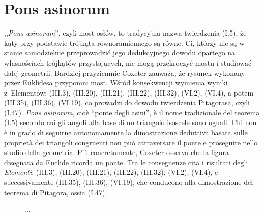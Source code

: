 
%



\section{Pons asinorum}

,,\emph{Pons asinorum}'', czyli most osłów, to tradycyjna nazwa twierdzenia (I.5), że kąty przy podstawie trójkąta równoramiennego są równe. %
Ci, którzy nie są w stanie samodzielnie przeprowadzić jego dedukcyjnego dowodu opartego na własnościach trójkątów przystających, nie mogą przekroczyć mostu i studiować dalej geometrii. %
Bardziej przyziemnie Coxeter \cite[s. 22-24]{coxeter_1967} zauważa, że rysunek wykonany przez Euklidesa przypomni most. %
Wśród konsekwencji wymienia wyniki z~Elementów: (III.3), (III.20), (III.21), (III.22), (III.32), (VI.2), (VI.4), a potem (III.35), (III.36), (VI.19), co prowadzi do dowodu twierdzenia Pitagorasa, czyli (I.47). %
\emph{Pons asinorum}, cioè ``ponte degli asini'', è il nome tradizionale del teorema (I.5) secondo cui gli angoli alla base di un triangolo isoscele sono uguali. %
Chi non è in grado di seguirne autonomamente la dimostrazione deduttiva basata sulle proprietà dei triangoli congruenti non può attraversare il ponte e proseguire nello studio della geometria. %
Più concretamente, Coxeter \cite[pp. 22-24]{coxeter_1967} osserva che la figura disegnata da Euclide ricorda un ponte. %
Tra le conseguenze cita i risultati degli \emph{Elementi}: (III.3), (III.20), (III.21), (III.22), (III.32), (VI.2), (VI.4), e successivamente (III.35), (III.36), (VI.19), che conducono alla dimostrazione del teorema di Pitagora, ossia (I.47). %

\begin{figure}[H] \centering
...
\end{figure}

